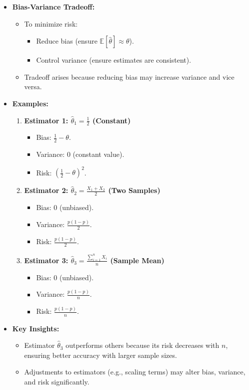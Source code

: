 \documentclass{article}
\begin{document}
\begin{itemize}
  \item \textbf{Bias-Variance Tradeoff:}
    \begin{itemize}
      \item To minimize risk:
        \begin{itemize}
          \item Reduce bias (ensure $\mathbb{E}[\hat{\theta}] \approx \theta$).
          \item Control variance (ensure estimates are consistent).
        \end{itemize}
      \item Tradeoff arises because reducing bias may increase variance and vice versa.
    \end{itemize}

  \item \textbf{Examples:}
    \begin{enumerate}
      \item \textbf{Estimator 1: $\hat{\theta}_1 = \frac{1}{2}$ (Constant)}
        \begin{itemize}
          \item Bias: $\frac{1}{2} - \theta$.
          \item Variance: 0 (constant value).
          \item Risk: $(\frac{1}{2} - \theta)^2$.
        \end{itemize}

      \item \textbf{Estimator 2: $\hat{\theta}_2 = \frac{X_1 + X_2}{2}$ (Two Samples)}
        \begin{itemize}
          \item Bias: $0$ (unbiased).
          \item Variance: $\frac{p(1-p)}{2}$.
          \item Risk: $\frac{p(1-p)}{2}$.
        \end{itemize}

      \item \textbf{Estimator 3: $\hat{\theta}_3 = \frac{\sum_{i=1}^n X_i}{n}$ (Sample Mean)}
        \begin{itemize}
          \item Bias: $0$ (unbiased).
          \item Variance: $\frac{p(1-p)}{n}$.
          \item Risk: $\frac{p(1-p)}{n}$.
        \end{itemize}
    \end{enumerate}

  \item \textbf{Key Insights:}
    \begin{itemize}
      \item Estimator $\hat{\theta}_3$ outperforms others because its risk decreases with $n$, ensuring better accuracy with larger sample sizes.
      \item Adjustments to estimators (e.g., scaling terms) may alter bias, variance, and risk significantly.
    \end{itemize}
\end{itemize}
\end{document}
